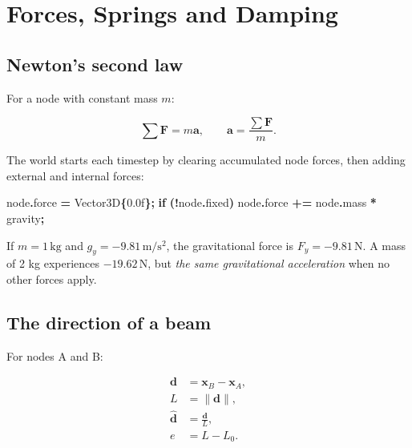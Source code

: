 \documentclass[
  10pt,
  a4paper,
]{article}
\newenvironment{Shaded}{\begin{snugshade}}{\end{snugshade}}
\newcommand{\BuiltInTok}[1]{#1}
\newcommand{\ControlFlowTok}[1]{\textcolor[rgb]{0.13,0.29,0.53}{\textbf{#1}}}
\newcommand{\FloatTok}[1]{\textcolor[rgb]{0.00,0.00,0.81}{#1}}
\newcommand{\NormalTok}[1]{#1}
\newcommand{\OperatorTok}[1]{\textcolor[rgb]{0.81,0.36,0.00}{\textbf{#1}}}
\begin{document}
\newpage

\section{Forces, Springs and Damping}\label{forces-springs-and-damping}

\subsection{Newton's second law}\label{newtons-second-law}

For a node with constant mass \(m\):

\[\sum \mathbf F = m\mathbf a, \qquad \mathbf a=\frac{\sum\mathbf F}{m}.\]

The world starts each timestep by clearing accumulated node forces, then
adding external and internal forces:

\begin{Shaded}
\begin{Highlighting}[]
\NormalTok{node}\OperatorTok{.}\NormalTok{force }\OperatorTok{=}\NormalTok{ Vector3D}\OperatorTok{\{}\FloatTok{0.0}\BuiltInTok{f}\OperatorTok{\};}
\ControlFlowTok{if} \OperatorTok{(!}\NormalTok{node}\OperatorTok{.}\NormalTok{fixed}\OperatorTok{)}\NormalTok{ node}\OperatorTok{.}\NormalTok{force }\OperatorTok{+=}\NormalTok{ node}\OperatorTok{.}\NormalTok{mass }\OperatorTok{*}\NormalTok{ gravity}\OperatorTok{;}
\end{Highlighting}
\end{Shaded}

If \(m=1\,\mathrm{kg}\) and \(g_y=-9.81\,\mathrm{m/s^2}\), the
gravitational force is \(F_y=-9.81\,\mathrm N\). A mass of 2 kg
experiences \(-19.62\,\mathrm N\), but \emph{the same gravitational
acceleration} when no other forces apply.

\subsection{The direction of a beam}\label{the-direction-of-a-beam}

For nodes A and B:

\[
\begin{aligned}
\mathbf d &= \mathbf x_B-\mathbf x_A,\\
L &= \lVert\mathbf d\rVert,\\
\hat{\mathbf d} &= \frac{\mathbf d}{L},\\
e &= L-L_0.
\end{aligned}
\]
\end{document}
